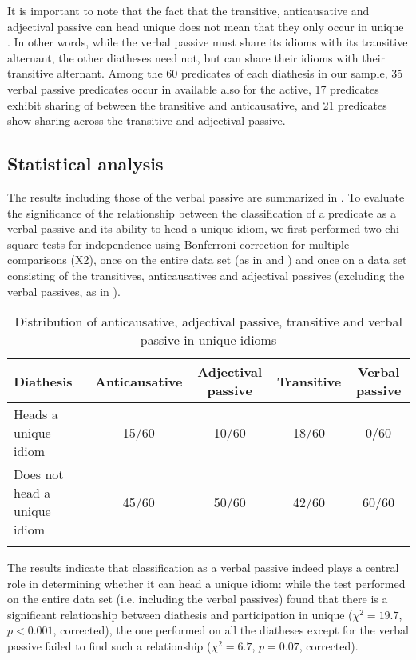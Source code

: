 \documentclass[output=paper]{langsci/langscibook}
\begin{document}
It is important to note that the fact that the transitive, anticausative and
adjectival passive can head unique  does not mean that they only occur in
unique . In other words, while the verbal passive must share its idioms
with its transitive alternant, the other diatheses need not, but can share their
idioms with their transitive alternant. Among the 60 predicates of each
diathesis in our sample, 35 verbal passive predicates occur in  available
also for the active, 17 predicates exhibit sharing of  between the
transitive and anticausative, and 21 predicates show sharing across the
transitive and adjectival passive.

\subsection{Statistical analysis}  %

The results including those of the verbal passive are summarized in
. To evaluate the significance of the relationship between
the classification of a predicate as a verbal passive and its ability to head a
unique idiom, we first performed two chi-square tests for independence using
Bonferroni correction for multiple comparisons (X2), once on the entire data
set (as in  and ) and once on a
data set consisting of the transitives, anticausatives and adjectival passives
(excluding the verbal passives, as in ).

\begin{table}
\caption{Distribution of anticausative, adjectival passive,
transitive and verbal passive in unique idioms}\label{tab:20.2}
\begin{tabularx}{\textwidth}{lCCCC}
\lsptoprule
 Diathesis &  Anti\-causative  &  Adjectival passive &  Transi\-tive &  Verbal passive\\
\midrule
 Heads a unique idiom & 15/60 & 10/60 & 18/60 & 0/60\\
 Does not head a unique idiom & 45/60 & 50/60 & 42/60 & 60/60 \\
\lspbottomrule
\end{tabularx}
\end{table}

The results indicate that classification as a verbal passive indeed plays a
central role in determining whether it can head a unique idiom: while the test
performed on the entire data set (i.e. including the verbal passives) found
that there is a significant relationship between diathesis and participation in
unique  ($\chi^2 = 19.7$, $p < 0.001$, corrected), the one performed on all
the diatheses except for the verbal passive failed to find such a relationship
($\chi^2 = 6.7$, $p = 0.07$, corrected).
\end{document}
